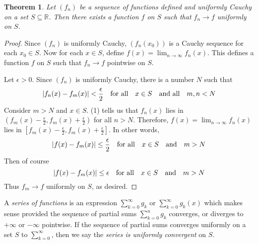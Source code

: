 \documentclass[12pt, lettersize]{book}
\newtheorem{thm}{Theorem}[section]
\newcommand{\R}{\mathbb{R}}
\begin{document}
			\setcounter{equation}{0}
			\begin{thm}\label{thm:25.4}
			Let $(f_n)$ be a sequence of functions defined and uniformly Cauchy on a set $S\subseteq\R$. Then there exists a function $f$ on $S$ such that $f_n\rightarrow f$ uniformly on $S$.
			\end{thm}
			\begin{proof}
			Since $(f_n)$ is uniformly Cauchy, $(f_n(x_0))$ is a Cauchy sequence for each $x_0\in S$. Now for each $x\in S$, define $f(x)=\lim_{n\rightarrow\infty}f_n(x)$. This defines a function $f$ on $S$ such that $f_n\rightarrow f$ pointwise on $S$.
			
			Let $\epsilon>0$. Since $(f_n)$ is uniformly Cauchy, there is a number $N$ such that 
			\begin{equation}
				\abs{f_n(x)-f_m(x)}<\frac{\epsilon}{2}\quad\text{for all}\quad x\in S\quad\text{and all}\quad m,n<N
			\end{equation}
			Consider $m>N$ and $x\in S$. (1) tells us that $f_n(x)$ lies in $(f_m(x)-\frac{\epsilon}{2},f_m(x)+\frac{\epsilon}{2})$ for all $n>N$. Therefore, $f(x)=\lim_{n\rightarrow \infty}f_n(x)$ lies in $[f_m(x)-\frac{\epsilon}{2},f_m(x)+\frac{\epsilon}{2}]$. In other words,
			\begin{displaymath}
				\abs{f(x)-f_m(x)}\leq\frac{\epsilon}{2}\quad\text{for all}\quad x\in S\quad\text{and}\quad m>N
			\end{displaymath}
			Then of course
			\begin{displaymath}
				\abs{f(x)-f_m(x)}\leq\epsilon\quad\text{for all}\quad x\in S\quad\text{and}\quad m>N
			\end{displaymath}
			Thus $f_m\rightarrow f$ uniformly on $S$, as desired.
			\end{proof}
			
			A \emph{series of functions} is an expression $\sum_{k=0}^{\infty}g_k$ or $\sum_{k=0}^{\infty}g_k(x)$ which makes sense provided the sequence of partial sums $\sum_{k=0}^{n}g_k$ converges, or diverges to $+\infty$ or $-\infty$ pointwise. If the sequence of partial sums converges uniformly on a set $S$ to $\sum_{k=0}^{\infty}$, then we say the \emph{series is uniformly convergent} on $S$.
			
\end{document}
